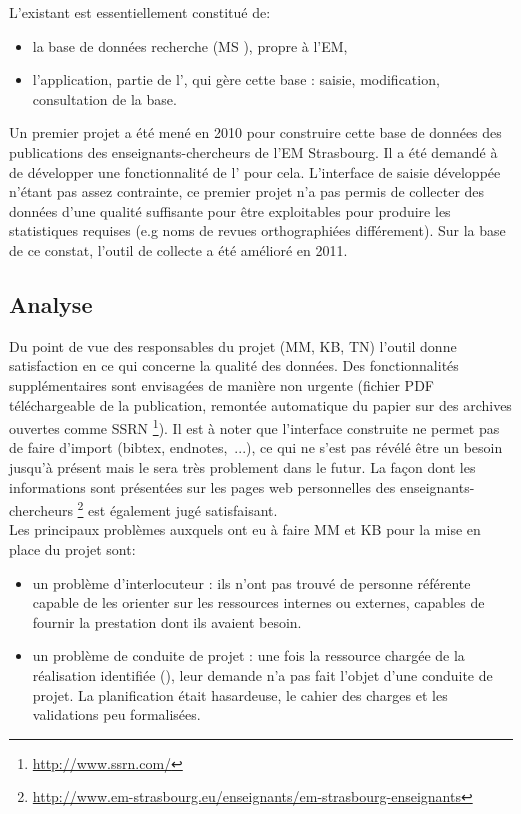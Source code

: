 \documentclass{book}
\begin{document}
L'existant est essentiellement constitué de:
\begin{itemize}
\item la base de données recherche (MS ), propre à l'EM,
\item l'application, partie de l', qui gère cette base : 
saisie, modification, consultation de la base.
\end{itemize}
Un premier projet a été mené en 2010 pour construire cette base de données des
publications des enseignants-chercheurs de l'EM Strasbourg. Il a été demandé à 
\CK de développer une fonctionnalité de l' pour cela. L'interface 
de saisie développée n'étant pas assez contrainte, ce premier projet n'a pas 
permis de collecter des données d'une qualité suffisante pour être exploitables
pour produire les statistiques requises (e.g noms de revues orthographiées 
différement). Sur la base de ce constat, l'outil de collecte a été amélioré en 
2011. 

\subsection{Analyse}

Du point de vue des responsables du projet (MM, KB, TN) l'outil donne 
satisfaction en ce qui concerne la qualité des données. Des fonctionnalités 
supplémentaires sont envisagées de manière non urgente (fichier PDF téléchargeable 
de la publication, remontée automatique du papier sur des archives ouvertes comme SSRN%
\footnote{\url{ http://www.ssrn.com/}}).
Il est à noter que l'interface construite ne permet pas de faire d'import (bibtex, 
endnotes,~...), ce qui ne s'est pas révélé être un besoin jusqu'à présent mais
le sera très problement dans le futur. 
La façon dont les informations sont présentées sur les pages web personnelles
des enseignants-chercheurs%
\footnote{\url{http://www.em-strasbourg.eu/enseignants/em-strasbourg-enseignants}}
est également jugé satisfaisant.\\

Les principaux problèmes auxquels ont eu à faire MM et KB pour la mise 
en place du projet sont:
\begin{itemize}
\item un problème d'interlocuteur : ils n'ont pas trouvé de personne référente 
capable de les orienter sur les ressources internes ou externes, capables de fournir 
la prestation dont ils avaient besoin.
\item un problème de conduite de projet : une fois la ressource chargée de la 
réalisation identifiée (\CK), leur demande n'a pas fait l'objet d'une conduite
de projet. La planification était hasardeuse, le cahier des charges et
les validations peu formalisées.
\end{itemize}
\end{document}
